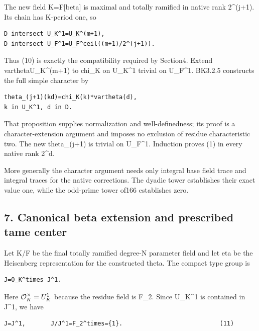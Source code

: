 The new field K=F{[}beta{]} is maximal and totally ramified in native
rank 2\^{}(j+1). Its chain has K-period one, so

\begin{Verbatim}[fontsize=\small,breaklines=true,breakanywhere=true]
D intersect U_K^1=U_K^(m+1),
D intersect U_F^1=U_F^ceil((m+1)/2^(j+1)).
\end{Verbatim}

Thus (10) is exactly the compatibility required by Section4. Extend
vartheta\textbar U\_K\^{}(m+1) to chi\_K on U\_K\^{}1 trivial on
U\_F\^{}1. BK3.2.5 constructs the full simple character by

\begin{Verbatim}[fontsize=\small,breaklines=true,breakanywhere=true]
theta_(j+1)(kd)=chi_K(k)*vartheta(d),
k in U_K^1, d in D.
\end{Verbatim}

That proposition supplies normalization and well-definedness; its proof
is a character-extension argument and imposes no exclusion of residue
characteristic two. The new theta\_(j+1) is trivial on U\_F\^{}1.
Induction proves (1) in every native rank 2\^{}d.

More generally the character argument needs only integral base field
trace and integral traces for the native corrections. The dyadic tower
establishes their exact value one, while the odd-prime tower of166
establishes zero.

\hypertarget{dyadic_character-canonical-beta-extension-and-prescribed-tame-center}{%
\subsection{7. Canonical beta extension and prescribed tame
center}\label{dyadic_character-canonical-beta-extension-and-prescribed-tame-center}}

Let K/F be the final totally ramified degree-N parameter field and let
eta be the Heisenberg representation for the constructed theta. The
compact type group is

\begin{Verbatim}[fontsize=\small,breaklines=true,breakanywhere=true]
J=O_K^times J^1.
\end{Verbatim}

Here \(\mathcal O_K^\times=U_K^1\) because the residue field is
F\_2. Since U\_K\^{}1 is contained in J\^{}1, we have

\begin{Verbatim}[fontsize=\small,breaklines=true,breakanywhere=true]
J=J^1,       J/J^1=F_2^times={1}.                           (11)
\end{Verbatim}

